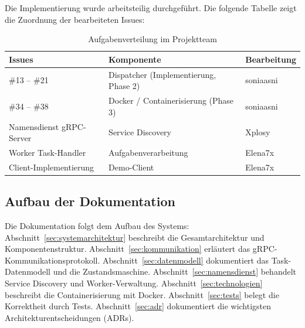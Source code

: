 Die Implementierung wurde arbeitsteilig durchgeführt.
Die folgende Tabelle zeigt die Zuordnung der bearbeiteten Issues:

\begin{table}[H]
\centering
\begin{tabular}{lll}
\toprule
\textbf{Issues} & \textbf{Komponente} & \textbf{Bearbeitung} \\
\midrule
\#13 -- \#21 & Dispatcher (Implementierung, Phase 2) & soniaasni \\
\#34 -- \#38 & Docker / Containerisierung (Phase 3) & soniaasni \\
Namensdienst gRPC-Server & Service Discovery & Xplosy \\
Worker Task-Handler & Aufgabenverarbeitung & Elena7x \\
Client-Implementierung & Demo-Client & Elena7x \\
\bottomrule
\end{tabular}
\caption{Aufgabenverteilung im Projektteam}
\end{table}

\subsection{Aufbau der Dokumentation}

Die Dokumentation folgt dem Aufbau des Systems:
Abschnitt~\ref{sec:systemarchitektur} beschreibt die Gesamtarchitektur und
Komponentenstruktur.
Abschnitt~\ref{sec:kommunikation} erläutert das gRPC-Kommunikationsprotokoll.
Abschnitt~\ref{sec:datenmodell} dokumentiert das Task-Datenmodell und die Zustandsmaschine.
Abschnitt~\ref{sec:namensdienst} behandelt Service Discovery und Worker-Verwaltung.
Abschnitt~\ref{sec:technologien} beschreibt die Containerisierung mit Docker.
Abschnitt~\ref{sec:tests} belegt die Korrektheit durch Tests.
Abschnitt~\ref{sec:adr} dokumentiert die wichtigsten Architekturentscheidungen (ADRs).
